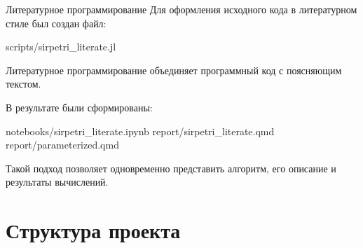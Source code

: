 \documentclass[
  ignorenonframetext,
  aspectratio=169,
  russian,
]{beamer}
\newenvironment{Shaded}{\begin{snugshade}}{\end{snugshade}}
\newcommand{\NormalTok}[1]{\textcolor[rgb]{0.00,0.23,0.31}{#1}}
\begin{document}
\begin{frame}[fragile]{Литературное программирование}
Для оформления исходного кода в литературном стиле был создан файл:

\begin{Shaded}
\begin{Highlighting}[]
\NormalTok{scripts/sirpetri\_literate.jl}
\end{Highlighting}
\end{Shaded}

Литературное программирование объединяет программный код с поясняющим
текстом.

В результате были сформированы:

\begin{Shaded}
\begin{Highlighting}[]
\NormalTok{notebooks/sirpetri\_literate.ipynb}
\NormalTok{report/sirpetri\_literate.qmd}
\NormalTok{report/parameterized.qmd}
\end{Highlighting}
\end{Shaded}

Такой подход позволяет одновременно представить алгоритм, его описание и
результаты вычислений.
\end{frame}

\section{Структура
проекта}\label{ux441ux442ux440ux443ux43aux442ux443ux440ux430-ux43fux440ux43eux435ux43aux442ux430}
\end{document}
